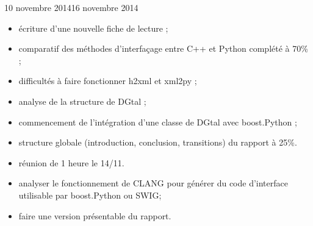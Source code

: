 \documentclass[11pt, french, screen]{report-rd-info}
\begin{document}
\begin{fichesuivi}{10 novembre 2014}{16 novembre 2014}

	\begin{travaileffectue}
	    \begin{itemize}
	        \item écriture d'une nouvelle fiche de lecture ;
            \item comparatif des méthodes d'interfaçage entre C++ et Python complété à 70\% ;
            \item difficultés à faire fonctionner h2xml et xml2py ;
            \item analyse de la structure de DGtal ;
            \item commencement de l'intégration d'une classe de DGtal avec boost.Python ;
            \item structure globale (introduction, conclusion, transitions) du rapport à  25\%.
	    \end{itemize}
	\end{travaileffectue}

	\begin{travailnoneffectue}
	\end{travailnoneffectue}

	\begin{echange}
    	\begin{itemize}
    	    \item réunion de 1 heure le 14/11.
    	\end{itemize}
	\end{echange}

	\begin{planification}
	    \begin{itemize}
    	    \item  analyser le fonctionnement de CLANG pour générer du code d'interface utilisable par boost.Python ou SWIG;
            \item faire une version présentable du rapport.
	    \end{itemize}
	\end{planification}
\end{fichesuivi}
\end{document}
